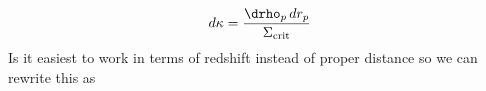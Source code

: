 \begin{equation}
\label{eqn:dkappa}
  d\kappa = \frac{\drho_p\,dr_p}{\Sigma_{\rm crit}}
 \end{equation}
Is it easiest to work in terms of redshift instead of proper distance so we can rewrite this as
  